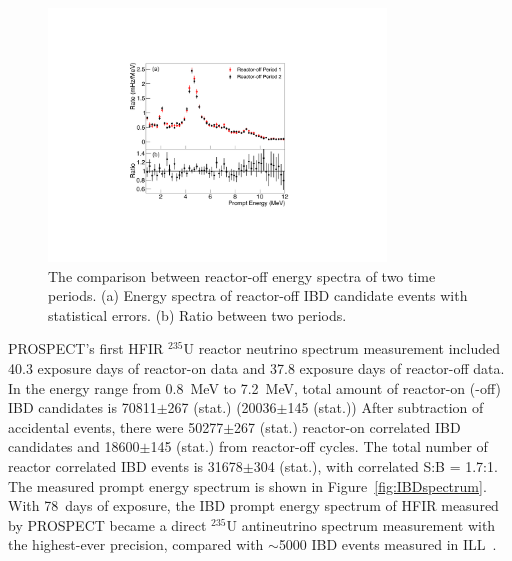 \begin{figure}[h!]
    \centering
    \includegraphics[width=0.8\textwidth]{Figures/BG_Stability.pdf}
    \caption[Reactor-off data energy stability]{
    The comparison between reactor-off energy spectra of two time periods. 
    (a) Energy spectra of reactor-off IBD candidate events with statistical errors. 
    (b) Ratio between two periods. }
    \label{fig:BGstability}
\end{figure}


PROSPECT's first HFIR $^{235}$U reactor neutrino spectrum measurement included 40.3 exposure days of reactor-on data and 37.8 exposure days of reactor-off data.
In the energy range from 0.8~MeV to 7.2~MeV, total amount of reactor-on (-off) IBD candidates is 70811$\pm$267 (stat.) (20036$\pm$145 (stat.)) 
After subtraction of accidental events, there were 50277$\pm$267 (stat.) reactor-on correlated IBD candidates and 18600$\pm$145 (stat.) from reactor-off cycles.
The total number of reactor correlated IBD events is 31678$\pm$304 (stat.), with correlated S:B = 1.7:1.
The measured prompt energy spectrum is shown in Figure~\ref{fig:IBDspectrum}.
With 78~days of exposure, the IBD prompt energy spectrum of HFIR measured by PROSPECT became a direct $^{235}$U antineutrino spectrum measurement with the highest-ever precision, compared with $\sim$5000 IBD events measured in ILL~\cite{bib:ILL1985}.

